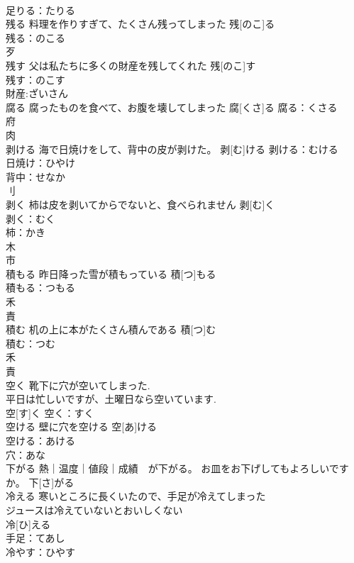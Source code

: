 \documentclass[8pt]{extreport}
\begin{document}
\begin{CJK}{UTF8}{min}
\\	足りる：たりる
\\	残る	料理を作りすぎて、たくさん残ってしまった	残[のこ]る	
\\	残る：のこる
\\	歹 
\\	残す	父は私たちに多くの財産を残してくれた	残[のこ]す	
\\	残す：のこす
\\	財産:ざいさん
\\	腐る	腐ったものを食べて、お腹を壊してしまった	腐[くさ]る			腐る：くさる
\\	府 
\\	肉 
\\	剥ける	海で日焼けをして、背中の皮が剥けた。	剥[む]ける			剥ける：むける
\\	日焼け：ひやけ
\\	背中：せなか
\\	刂 
\\	剥く	柿は皮を剥いてからでないと、食べられません	剥[む]く	
\\	剥く：むく
\\	柿：かき
\\	木 
\\	市 
\\	積もる	昨日降った雪が積もっている	積[つ]もる	
\\	積もる：つもる
\\	禾 
\\	責 
\\	積む	机の上に本がたくさん積んである	積[つ]む	
\\	積む：つむ
\\	禾 
\\	責 
\\	空く	靴下に穴が空いてしまった. 
\\	平日は忙しいですが、土曜日なら空いています. 
\\	空[す]く			空く：すく
\\	空ける	壁に穴を空ける	空[あ]ける	
\\	空ける：あける
\\	穴：あな
\\	下がる	熱｜温度｜値段｜成績　が下がる。 お皿をお下げしてもよろしいですか。	下[さ]がる	
\\	冷える	寒いところに長くいたので、手足が冷えてしまった 
\\	ジュースは冷えていないとおいしくない 
\\	冷[ひ]える	
\\	手足：てあし
\\	冷やす：ひやす

\end{CJK}
\end{document}
